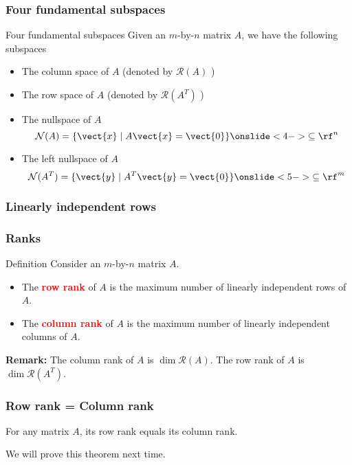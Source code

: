 \begin{frame}
  \frametitle{Four fundamental subspaces}

  \begin{block}{Four fundamental subspaces}
    Given an $m$-by-$n$ matrix $A$, we have the following subspaces
    \begin{itemize}
    \item The column space of $A$ (denoted by ${\mathcal R}(A)$
      )
    \item The row space of $A$ (denoted by ${\mathcal R}(A^T)$
      )
    \item The nullspace of $A$
      \[
        {\mathcal N}(A) = \{\vect{x} \;|\; A\vect{x}=\vect{0}\}
        \onslide<4->{\subseteq \rf^n}
      \]
    \item The left nullspace of $A$
      \[
        {\mathcal N}(A^T) = \{\vect{y} \;|\; A^T\vect{y}=\vect{0}\}
        \onslide<5->{\subseteq \rf^m}
      \]
    \end{itemize}
  \end{block}
\end{frame}

\begin{frame}
  \frametitle{Linearly independent rows}
  
\end{frame}

\begin{frame}
  \frametitle{Ranks}

  \begin{block}{Definition}
    Consider an $m$-by-$n$ matrix $A$.
    \begin{itemize}
    \item The \textcolor{red}{\bf row rank} of $A$ is the maximum
      number of linearly independent rows of $A$.
    \item The \textcolor{red}{\bf column rank} of $A$ is the maximum
      number of linearly independent columns of $A$.
    \end{itemize}
  \end{block}

  \vspace{0.2in}

  \pause

  {\bf Remark:} The column rank of $A$ is $\dim {\mathcal R}(A)$.  The
  row rank of $A$ is $\dim {\mathcal R}(A^T)$.
\end{frame}

\begin{frame}
  \frametitle{Row rank = Column rank}

  \begin{theorem}
    For any matrix $A$, its row rank equals its column rank.
  \end{theorem}

  \vspace{0.2in}
  {\small We will prove this theorem next time.}
  
\end{frame}
